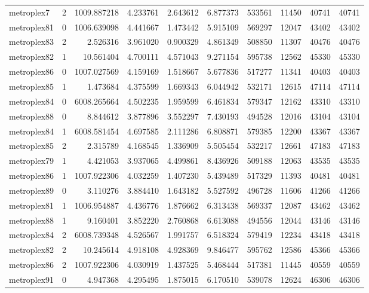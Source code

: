 \begin{longtable}{|l|r|r|r|r|r|r|r|r|r|}
metroplex7 & 2 & 1009.887218 & 4.233761 & 2.643612 & 6.877373 & 533561 & 11450 & 40741 & 40741 \\
metroplex81 & 0 & 1006.639098 & 4.441667 & 1.473442 & 5.915109 & 569297 & 12047 & 43402 & 43402 \\
metroplex83 & 2 & 2.526316 & 3.961020 & 0.900329 & 4.861349 & 508850 & 11307 & 40476 & 40476 \\
metroplex82 & 1 & 10.561404 & 4.700111 & 4.571043 & 9.271154 & 595738 & 12562 & 45330 & 45330 \\
metroplex86 & 0 & 1007.027569 & 4.159169 & 1.518667 & 5.677836 & 517277 & 11341 & 40403 & 40403 \\
metroplex85 & 1 & 1.473684 & 4.375599 & 1.669343 & 6.044942 & 532171 & 12615 & 47114 & 47114 \\
metroplex84 & 0 & 6008.265664 & 4.502235 & 1.959599 & 6.461834 & 579347 & 12162 & 43310 & 43310 \\
metroplex88 & 0 & 8.844612 & 3.877896 & 3.552297 & 7.430193 & 494528 & 12016 & 43104 & 43104 \\
metroplex84 & 1 & 6008.581454 & 4.697585 & 2.111286 & 6.808871 & 579385 & 12200 & 43367 & 43367 \\
metroplex85 & 2 & 2.315789 & 4.168545 & 1.336909 & 5.505454 & 532217 & 12661 & 47183 & 47183 \\
metroplex79 & 1 & 4.421053 & 3.937065 & 4.499861 & 8.436926 & 509188 & 12063 & 43535 & 43535 \\
metroplex86 & 1 & 1007.922306 & 4.032259 & 1.407230 & 5.439489 & 517329 & 11393 & 40481 & 40481 \\
metroplex89 & 0 & 3.110276 & 3.884410 & 1.643182 & 5.527592 & 496728 & 11606 & 41266 & 41266 \\
metroplex81 & 1 & 1006.954887 & 4.436776 & 1.876662 & 6.313438 & 569337 & 12087 & 43462 & 43462 \\
metroplex88 & 1 & 9.160401 & 3.852220 & 2.760868 & 6.613088 & 494556 & 12044 & 43146 & 43146 \\
metroplex84 & 2 & 6008.739348 & 4.526567 & 1.991757 & 6.518324 & 579419 & 12234 & 43418 & 43418 \\
metroplex82 & 2 & 10.245614 & 4.918108 & 4.928369 & 9.846477 & 595762 & 12586 & 45366 & 45366 \\
metroplex86 & 2 & 1007.922306 & 4.030919 & 1.437525 & 5.468444 & 517381 & 11445 & 40559 & 40559 \\
metroplex91 & 0 & 4.947368 & 4.295495 & 1.875015 & 6.170510 & 539078 & 12624 & 46306 & 46306 \\

\end{longtable}
